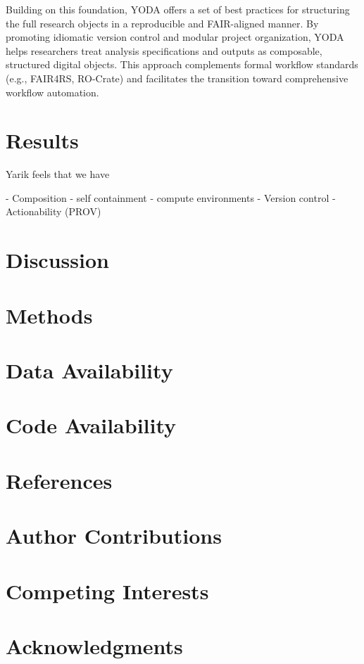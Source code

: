 \documentclass{article}
\begin{document}
Building on this foundation, YODA offers a set of best practices for structuring the full research objects in a reproducible and FAIR-aligned manner.
By promoting idiomatic version control and modular project organization, YODA helps researchers treat analysis specifications and outputs as composable, structured digital objects.
This approach complements formal workflow standards (e.g., FAIR4RS, RO-Crate) and facilitates the transition toward comprehensive workflow automation.



\section{Results}



Yarik feels that we have

- Composition
 - self containment
 - compute environments 
- Version control
- Actionability (PROV)

\section{Discussion}
\section{Methods}
\section{Data Availability}
\section{Code Availability}
\section{References}
\section{Author Contributions}
\section{Competing Interests}
\section{Acknowledgments}
\end{document}
